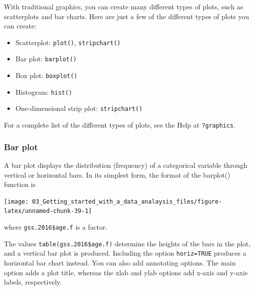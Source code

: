 \documentclass[
]{book}
\newenvironment{Shaded}{\begin{snugshade}}{\end{snugshade}}
\newcommand{\AttributeTok}[1]{\textcolor[rgb]{0.77,0.63,0.00}{#1}}
\newcommand{\DecValTok}[1]{\textcolor[rgb]{0.00,0.00,0.81}{#1}}
\newcommand{\FloatTok}[1]{\textcolor[rgb]{0.00,0.00,0.81}{#1}}
\newcommand{\FunctionTok}[1]{\textcolor[rgb]{0.00,0.00,0.00}{#1}}
\newcommand{\NormalTok}[1]{#1}
\newcommand{\SpecialCharTok}[1]{\textcolor[rgb]{0.00,0.00,0.00}{#1}}
\providecommand{\tightlist}{%
  \setlength{\itemsep}{0pt}\setlength{\parskip}{0pt}}
\begin{document}
With traditional graphics, you can create many different types of plots, such as
scatterplots and bar charts. Here are just a few of the different types of plots
you can create:

\begin{itemize}
\tightlist
\item
  Scatterplot: \texttt{plot()}, \texttt{stripchart()}
\item
  Bar plot: \texttt{barplot()}
\item
  Box plot: \texttt{boxplot()}
\item
  Histogram: \texttt{hist()}
\item
  One-dimensional strip plot: \texttt{stripchart()}
\end{itemize}

For a complete list of the different types of plots, see the Help at
\texttt{?graphics}.

\hypertarget{bar-plot}{%
\subsubsection{Bar plot}\label{bar-plot}}

A bar plot displays the distribution (frequency) of a categorical variable through vertical or horizontal bars. In its simplest form, the format of the barplot() function is

\begin{Shaded}
\end{Shaded}

\begin{center}\texttt{[image: 03\_Getting\_started\_with\_a\_data\_analaysis\_files/figure-latex/unnamed-chunk-39-1]} \end{center}

where \texttt{gss.2016\$age.f} is a factor.

The values \texttt{table(gss.2016\$age.f)} determine the heights of the bars in the plot, and a vertical bar plot is produced. Including the option \texttt{horiz=TRUE} produces a horizontal bar chart instead. You can also add annotating options. The main option adds a plot title, whereas the xlab and ylab options add x-axis and y-axis labels, respectively.
\end{document}
